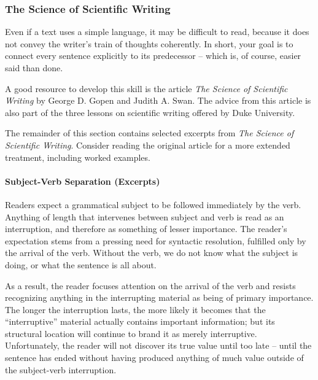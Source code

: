 \subsubsection{The Science of Scientific Writing}

Even if a text uses a simple language, it may be difficult to read, because it does not convey the writer's train of thoughts coherently. In short, your goal is to connect every sentence explicitly to its predecessor – which is, of course, easier said than done.

A good resource to develop this skill is the article \emph{The Science of Scientific Writing} by George D. Gopen and Judith A. Swan. 
The advice from this article is also part of the three lessons on scientific writing offered by Duke University.

The remainder of this section contains selected excerpts from \emph{The Science of Scientific Writing}. Consider reading the original article for a more extended treatment, including worked examples.

\paragraph{Subject-Verb Separation (Excerpts)}

  Readers expect a grammatical subject to be followed immediately by the verb. Anything of length that intervenes between subject and verb is read as an interruption, and therefore as something of lesser importance.
The reader’s expectation stems from a pressing need for syntactic resolution, fulfilled only by the arrival of the verb. Without the verb, we do not know what the subject is doing, or what the sentence is all about.

As a result, the reader focuses attention on the arrival of the verb and resists recognizing anything in the interrupting material as being of primary importance.
The longer the interruption lasts, the more likely it becomes that the “interruptive” material actually contains important information; but its structural location will continue to brand it as merely interruptive.
Unfortunately, the reader will not discover its true value until too late – until the sentence has ended without having produced anything of much value outside of the subject-verb interruption.

